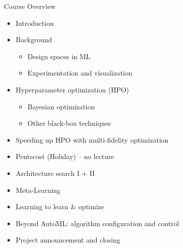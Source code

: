 \begin{frame}[c]{Course Overview}

\begin{itemize}
	\item Introduction
	\item Background
	\begin{itemize}
		\item Design spaces in ML
		\item Experimentation and visualization
	\end{itemize}
	\item Hyperparameter optimization (HPO)
	\begin{itemize}
	  \item Bayesian optimization
	  \item Other black-box techniques
	\end{itemize}
	\item Speeding up HPO with multi-fidelity optimization
	\item Pentecost (Holiday) -- no lecture
	\item Architecture search I + II
	\item Meta-Learning
	\item Learning to learn $\&$ optimize
	\item Beyond AutoML: algorithm configuration and control
	\item Project announcement and closing
\end{itemize}


\end{frame}
